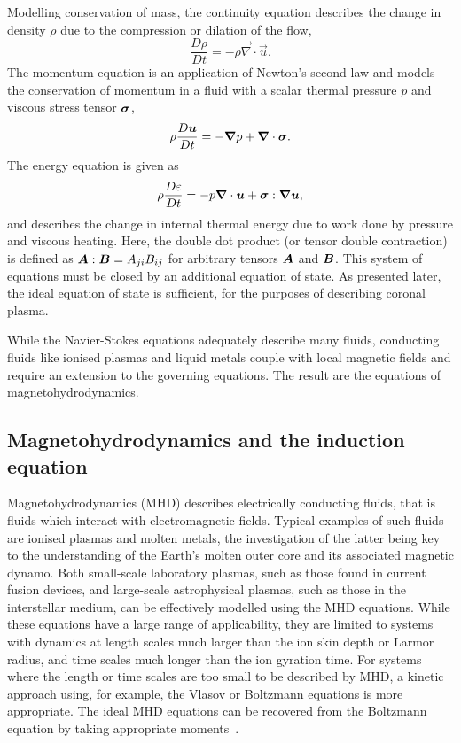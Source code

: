 Modelling conservation of mass, the continuity equation describes the change in density $\rho$ due to the compression or dilation of the flow,
\begin{equation}
\frac{D\rho}{Dt} = - \rho \vec{\nabla} \cdot \vec{u}.
\label{eq:ns_continuity}
\end{equation}
The momentum equation is an application of Newton's second law and models the conservation of momentum in a fluid with a scalar thermal pressure $p$ and viscous stress tensor ${\bm \sigma}$,
\begin{equation}
\rho\frac{D{\bm u}}{Dt} = -{\bm \nabla} p + {\bm \nabla} \cdot {\bm \sigma}.
\label{eq:ns_momentum}
\end{equation}
The energy equation is given as
\begin{equation}
\rho\frac{D\varepsilon}{Dt} = -p {\bm \nabla} \cdot {\bm u} + {\bm \sigma} : {\bm \nabla}{\bm u},
\label{eq:ns_energy}
\end{equation}
and describes the change in internal thermal energy due to work done by pressure and viscous heating. Here, the double dot product (or tensor double contraction) is defined as ${\bm A}:{\bm B} = A_{ji} B_{ij}$ for arbitrary tensors ${\bm A}$ and ${\bm B}$. This system of equations must be closed by an additional equation of state. As presented later, the ideal equation of state is sufficient, for the purposes of describing coronal plasma.

While the Navier-Stokes equations adequately describe many fluids, conducting fluids like ionised plasmas and liquid metals couple with local magnetic fields and require an extension to the governing equations. The result are the equations of magnetohydrodynamics.

\subsection{Magnetohydrodynamics and the induction equation}

Magnetohydrodynamics (MHD) describes electrically conducting fluids, that is fluids which interact with electromagnetic fields. Typical examples of such fluids are ionised plasmas and molten metals, the investigation of the latter being key to the understanding of the Earth's molten outer core and its associated magnetic dynamo. Both small-scale laboratory plasmas, such as those found in current fusion devices, and large-scale astrophysical plasmas, such as those in the interstellar medium, can be effectively modelled using the MHD equations. While these equations have a large range of applicability, they are limited to systems with dynamics at length scales much larger than the ion skin depth or Larmor radius, and time scales much longer than the ion gyration time. For systems where the length or time scales are too small to be described by MHD, a kinetic approach using, for example, the Vlasov or Boltzmann equations is more appropriate. The ideal MHD equations can be recovered from the Boltzmann equation by taking appropriate moments~\cite{boydPhysicsPlasmas2003}.

